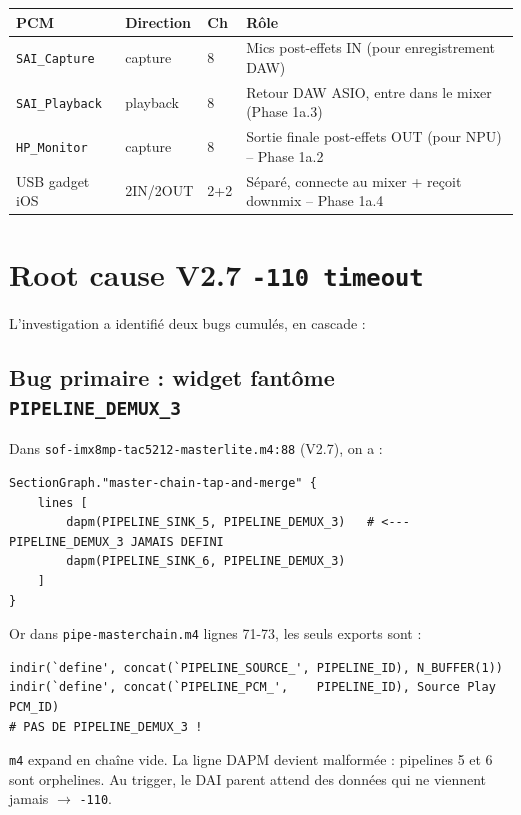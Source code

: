 \documentclass[11pt,a4paper]{article}
\begin{document}
\begin{center}
\begin{tabularx}{\textwidth}{lllX}
\toprule
\textbf{PCM} & \textbf{Direction} & \textbf{Ch} & \textbf{Rôle} \\
\midrule
\texttt{SAI\_Capture} & capture & 8 & Mics post-effets IN (pour enregistrement DAW) \\
\texttt{SAI\_Playback} & playback & 8 & Retour DAW ASIO, entre dans le mixer (Phase 1a.3) \\
\texttt{HP\_Monitor} & capture & 8 & Sortie finale post-effets OUT (pour NPU) -- Phase 1a.2 \\
USB gadget iOS & 2IN/2OUT & 2+2 & Séparé, connecte au mixer + reçoit downmix -- Phase 1a.4 \\
\bottomrule
\end{tabularx}
\end{center}

\section{Root cause V2.7 \texttt{-110 timeout}}\label{sec:rootcause}

L'investigation a identifié deux bugs cumulés, en cascade :

\subsection{Bug primaire : widget fantôme \texttt{PIPELINE\_DEMUX\_3}}

Dans \texttt{sof-imx8mp-tac5212-masterlite.m4:88} (V2.7), on a :
\begin{lstlisting}[basicstyle=\ttfamily\scriptsize]
SectionGraph."master-chain-tap-and-merge" {
    lines [
        dapm(PIPELINE_SINK_5, PIPELINE_DEMUX_3)   # <--- PIPELINE_DEMUX_3 JAMAIS DEFINI
        dapm(PIPELINE_SINK_6, PIPELINE_DEMUX_3)
    ]
}
\end{lstlisting}

Or dans \texttt{pipe-masterchain.m4} lignes 71-73, les seuls exports sont :
\begin{lstlisting}[basicstyle=\ttfamily\scriptsize]
indir(`define', concat(`PIPELINE_SOURCE_', PIPELINE_ID), N_BUFFER(1))
indir(`define', concat(`PIPELINE_PCM_',    PIPELINE_ID), Source Play PCM_ID)
# PAS DE PIPELINE_DEMUX_3 !
\end{lstlisting}

\texttt{m4} expand en chaîne vide. La ligne DAPM devient malformée : pipelines 5 et 6 sont orphelines. Au trigger, le DAI parent attend des données qui ne viennent jamais $\to$ \texttt{-110}.
\end{document}
